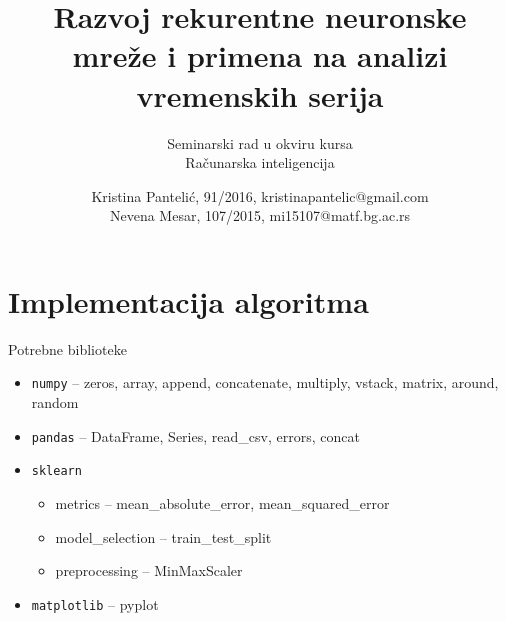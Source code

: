 \documentclass{beamer}
\title{Razvoj rekurentne neuronske mreže i primena na analizi \\ vremenskih serija}
\subtitle{\small{Seminarski rad u okviru kursa\\Računarska inteligencija}}
\author{\small{Kristina Pantelić, 91/2016, kristinapantelic@gmail.com \\Nevena Mesar, 107/2015, mi15107@matf.bg.ac.rs }}
\institute{Matematički fakultet}
\date{}
\begin{document}
\begin{frame}
    \maketitle
\end{frame}

\begin{frame}
    
\end{frame}

\begin{frame}
    
\end{frame}

\section{Implementacija algoritma}
\begin{frame}{Potrebne biblioteke}
    \begin{itemize}
        \item \texttt{numpy} -- 
        zeros, array, append, concatenate, multiply, vstack, matrix, around, random
        \item \texttt{pandas} -- DataFrame, Series, read\_csv, errors, concat
        \item \texttt{sklearn} 
            \begin{itemize}
                \item metrics -- mean\_absolute\_error, mean\_squared\_error
                \item model\_selection -- train\_test\_split
                \item preprocessing -- MinMaxScaler
            \end{itemize}
        \item \texttt{matplotlib} -- pyplot
    \end{itemize}
\end{frame}
\end{document}
